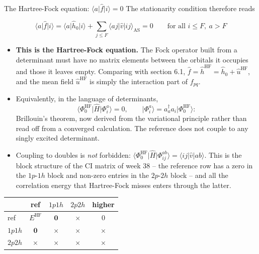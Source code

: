 \documentclass[aspectratio=169,10pt]{beamer}
\newcommand{\ket}[1]{\vert #1\rangle}
\newcommand{\element}[3]{\langle #1\vert #2\vert #3\rangle}
\begin{document}
\begin{frame}{The Hartree-Fock equation: $\langle a\vert\hat{f}\vert i\rangle=0$}
  \footnotesize
  The stationarity condition therefore reads
  \begin{block}{}
    \[
      \boxed{\;\element{a}{\hat{f}}{i}=\element{a}{\hat{h}_0}{i}+\sum_{j\le F}\element{aj}{\hat{v}}{ij}_{\mathrm{AS}}=0\qquad\text{for all }i\le F,\ a>F\;}
    \]
  \end{block}
  \begin{itemize}\scriptsize
    \item \textbf{This is the Hartree-Fock equation.} The Fock operator built from a determinant must have no matrix elements between the orbitals it occupies and those it leaves empty. Comparing with section 6.1, $\hat{f}=\hat{h}^{\mathrm{HF}}=\hat{h}_0+\hat{u}^{\mathrm{HF}}$, and the mean field $\hat{u}^{\mathrm{HF}}$ is simply the interaction part of $f_{pq}$.
    \item Equivalently, in the language of determinants,
    \[
      \element{\Phi_0^{\mathrm{HF}}}{\hat{H}}{\Phi_i^a}=0,\qquad\ket{\Phi_i^a}=a_a^{\dagger}a_i\ket{\Phi_0^{\mathrm{HF}}}:
    \]
    \alert{Brillouin's theorem, now derived from the variational principle} rather than read off from a converged calculation. The reference does not couple to any singly excited determinant.
    \item Coupling to doubles is \emph{not} forbidden: $\element{\Phi_0^{\mathrm{HF}}}{\hat{H}}{\Phi_{ij}^{ab}}=\element{ij}{\hat{v}}{ab}$. This is the block structure of the CI matrix of week 38 -- the reference row has a zero in the $1p$-$1h$ block and non-zero entries in the $2p$-$2h$ block -- and all the correlation energy that Hartree-Fock misses enters through the latter.
  \end{itemize}
  \begin{center}\scriptsize
  \renewcommand{\arraystretch}{1.1}
  \begin{tabular}{l|cccc}
    & ref & $1p1h$ & $2p2h$ & higher\\\hline
    ref & $E^{\mathrm{HF}}$ & $\mathbf{0}$ & $\times$ & $0$\\
    $1p1h$ & $\mathbf{0}$ & $\times$ & $\times$ & $\times$\\
    $2p2h$ & $\times$ & $\times$ & $\times$ & $\times$\\
  \end{tabular}
  \end{center}
\end{frame}
\end{document}
